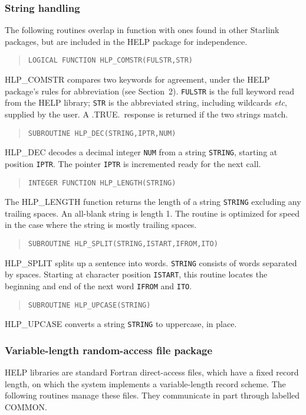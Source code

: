\subsubsection{String handling}
The following routines overlap in function with ones found
in other Starlink packages, but are included in the HELP package for
independence.

\begin{verse}
\verb|LOGICAL FUNCTION HLP_COMSTR(FULSTR,STR)|
\end{verse}
HLP\_COMSTR compares two keywords for agreement, under the HELP
package's rules for abbreviation (see Section~2).  \verb|FULSTR|
is the full keyword read from the HELP library; \verb|STR| is
the abbreviated string, including wildcards {\it etc}, supplied
by the user.  A .TRUE.\, response is returned if the
two strings match.

\begin{verse}
\verb|SUBROUTINE HLP_DEC(STRING,IPTR,NUM)|
\end{verse}
HLP\_DEC decodes a decimal integer \verb|NUM|
from a string \verb|STRING|, starting at position \verb|IPTR|.
The pointer \verb|IPTR| is incremented ready for the next call.

\begin{verse}
\verb|INTEGER FUNCTION HLP_LENGTH(STRING)|
\end{verse}
The HLP\_LENGTH function returns the
length of a string \verb|STRING| excluding any
trailing spaces.  An all-blank string is length 1.  The routine is
optimized for speed in the case where the string is mostly trailing
spaces.

\begin{verse}
\verb|SUBROUTINE HLP_SPLIT(STRING,ISTART,IFROM,ITO)|
\end{verse}
HLP\_SPLIT splits up a sentence into words.
\verb|STRING| consists of words separated by spaces.  Starting
at character position \verb|ISTART|, this routine locates the
beginning and end of the next word \verb|IFROM| and \verb|ITO|.

\begin{verse}
\verb|SUBROUTINE HLP_UPCASE(STRING)|
\end{verse}
HLP\_UPCASE converts a string \verb|STRING| to uppercase, in place.

\subsubsection{Variable-length random-access file package}
HELP libraries are standard Fortran direct-access files, which have
a fixed record length, on which the system implements a
variable-length record scheme.  The following routines manage
these files.  They communicate in part through labelled
COMMON.

